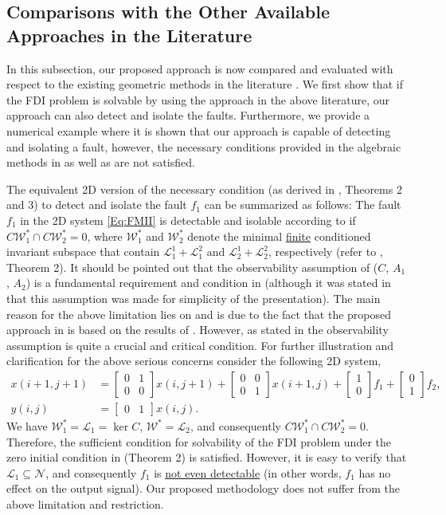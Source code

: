 \documentclass[journal,12pt,draftcls,onecolumn]{IEEEtran}
\newcommand{\bbm}{\begin{bmatrix}}
\newcommand{\ebm}{\end{bmatrix}}
\newcommand{\ssp}[1]{\mathscr{#1}}      \newcommand{\setssp}[1]{\mathfrak{#1}}   \newcommand{\fld}[1]{\mathbb{#1}}       \newcommand{\op}[1]{\mathcal{#1}}       \newcommand{\sumbanach}[1]{\sum{#1}}
\begin{document}
\subsection{Comparisons with the Other Available Approaches in the Literature}\label{Sec:FDIComparison}
In this subsection, our proposed approach is now compared and evaluated with respect to the existing geometric methods in the literature \cite{ Malek_3DFDI,Malek_3DFDIConf}. We first show that if the FDI problem is solvable by using the  approach in the above literature, our approach can also detect and isolate the faults. Furthermore, we provide a numerical example where it is shown that our approach is capable of detecting and isolating a fault, however, the necessary conditions provided in the algebraic methods in \cite{BisiaccoMultiDim,BisiaccoLetter} as well as \cite{Malek_3DFDI} are not satisfied.

The equivalent 2D version of the necessary condition (as derived in \cite{Malek_3DFDI}, Theorems 2 and 3) to detect and isolate the fault $f_1$ can be summarized as follows: The fault $f_1$ in the 2D system \eqref{Eq:FMII} is detectable and isolable according to  \cite{Malek_3DFDI} if $C\ssp{W}_{1}^*\cap C\ssp{W}_{2}^* =0$, where $\ssp{W}^*_1$ and $\ssp{W}^*_2$ denote the minimal \underline{finite} conditioned invariant subspace that contain $\ssp{L}_1^1+\ssp{L}_1^2$ and $\ssp{L}_2^1+\ssp{L}_2^2$, respectively (refer to \cite{Malek_3DFDI}, Theorem 2). It should be pointed out that the observability assumption of ($C$, $A_1$, $A_2$) is a fundamental requirement and condition  in \cite{Malek_3DFDI} (although it was stated in \cite{Malek_3DFDI} that this assumption was made for simplicity of the presentation). The main reason for the above limitation lies on and is due to the fact that the proposed approach in \cite{Malek_3DFDI} is based on the results of \cite{Massoumnia1986}. However, as stated in \cite{Massoumnia1986} the observability assumption is  quite a crucial and critical condition. For further illustration and  clarification for the above serious concerns consider the following 2D system,
\begin{equation}
	\begin{split}
		x(i+1,j+1) &= \bbm 0 &1\\0 &0\ebm x(i,j+1) + \bbm 0 &0\\0 &1\ebm x(i+1,j)+ \bbm 1\\0\ebm f_1+ \bbm 0\\1\ebm f_2,\\
		y(i,j) &= \bbm 0 &1\ebm x(i,j).
	\end{split}
\end{equation}
We have $\ssp{W}^*_1 = \ssp{L}_1=\ker C$, $\ssp{W}^*=\ssp{L}_2$, and consequently $C\ssp{W}_1^*\cap C\ssp{W}^*_2 = 0$. Therefore, the sufficient condition for solvability of the FDI problem under the zero initial condition in \cite{Malek_3DFDI} (Theorem 2) is satisfied. However, it is easy to verify that $\ssp{L}_1\subseteq\ssp{N}$, and consequently $f_1$ is \underline{not even detectable} (in other words, $f_1$ has no effect on the output signal). Our proposed methodology  does not suffer from the above limitation and restriction.
\end{document}
